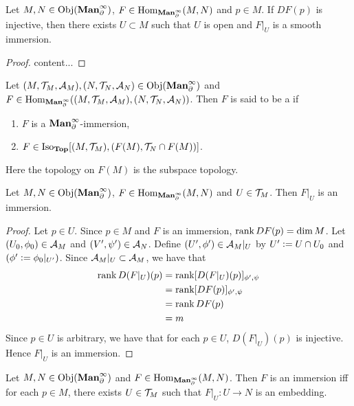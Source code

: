 \documentclass{book}
\begin{document}
	\begin{ex} 
		Let $M, N \in \operatorname{Obj}(\operatorname*{\text{\textbf{Man}}^{\infty}_{\partial}})$, $F \in \operatorname{Hom}_{\operatorname*{\text{\textbf{Man}}^{\infty}_{\partial}}}(M, N)$ and $p \in M$. If $DF(p)$ is injective, then there exists $U \subset M$ such that $U$ is open and $F|_U$ is a smooth immersion.
	\end{ex}

	\begin{proof}
		content...
	\end{proof}
	
	\begin{defn}  
		Let $(M, \mathcal{T}_M, \mathcal{A}_M), (N, \mathcal{T}_N, \mathcal{A}_N) \in \operatorname{Obj}(\operatorname*{\text{\textbf{Man}}^{\infty}_{\partial}})$ and $F \in \operatorname{Hom}_{\operatorname*{\text{\textbf{Man}}^{\infty}_{\partial}}}((M, \mathcal{T}_M, \mathcal{A}_M), (N, \mathcal{T}_N, \mathcal{A}_N) )$. Then $F$ is said to be a  if 
		\begin{enumerate}
			\item $F$ is a $\operatorname*{\text{\textbf{Man}}^{\infty}_{\partial}}$-immersion, 
			\item $F \in \operatorname{Iso}_{\operatorname*{\text{\textbf{Top}}}}[(M, \mathcal{T}_M), (F(M), \mathcal{T}_N \cap F(M))]$.
		\end{enumerate}	 
	\end{defn}	

	\begin{note}
	Here the topology on $F(M)$ is the subspace topology.
	\end{note}

	\begin{ex}
		Let $M,N \in \operatorname{Obj}(\operatorname*{\text{\textbf{Man}}^{\infty}_{\partial}})$, $F \in \operatorname{Hom}_{\operatorname*{\text{\textbf{Man}}^{\infty}_{\partial}}}(M,N)$ and $U \in \mathcal{T}_M$. Then $F|_U$ is an immersion. 
	\end{ex}

	\begin{proof}
		Let $p \in U$. Since $p \in M$ and $F$ is an immersion, $\operatorname{\text{rank}} DF(p) = \dim M$. Let $(U_0, \phi_0) \in \mathcal{A}_M$ and $(V', \psi') \in \mathcal{A}_N$. Define $(U', \phi') \in \mathcal{A}_M|_U$ by $U' \vcentcolon= U \cap U_0$ and $(\phi' \vcentcolon= \phi_0|_{U'})$. Since $\mathcal{A}_M|_U \subset \mathcal{A}_M$, we have that
		\begin{align*}
			\operatorname{\text{rank}} D(F|_U)(p)
			& = \operatorname{\text{rank}} [D(F|_U)(p)]_{\phi', \psi} \\
			& = \operatorname{\text{rank}} [DF(p)]_{\phi', \psi} \\
			& = \operatorname{\text{rank}} DF(p) \\
			& = m
		\end{align*}
		Since $p \in U$ is arbitrary, we have that for each $p \in U$, $D(F|_U)(p)$ is injective. Hence $F|_U$ is an immersion.  
	\end{proof}

	\begin{ex}
		Let $M, N \in \operatorname{Obj}(\operatorname*{\text{\textbf{Man}}^{\infty}_{\partial}})$ and $F \in \operatorname{Hom}_{\operatorname*{\text{\textbf{Man}}^{\infty}_{\partial}}}(M, N)$. Then $F$ is an immersion iff for each $p \in M$, there exists $U \in \mathcal{T}_M$ such that $F|_U:U \rightarrow N$ is an embedding.
	\end{ex}
\end{document}
